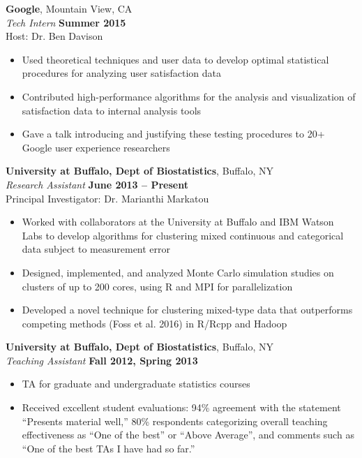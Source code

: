 \documentclass{article}
\begin{document}
 {\bf Google}, Mountain View, CA\\
 {\it Tech Intern} \hfill {\bf Summer 2015} \\
 Host: Dr. Ben Davison
 \begin{itemize} \itemsep -2pt
  \item Used theoretical techniques and user data to develop optimal statistical procedures for analyzing user satisfaction data
  \item Contributed high-performance algorithms for the analysis and visualization of satisfaction data to internal analysis tools
  \item Gave a talk introducing and justifying these testing procedures to 20+ Google user experience researchers
 \end{itemize}

 {\bf University at Buffalo, Dept of Biostatistics}, Buffalo, NY\\
 {\it Research Assistant} \hfill {\bf June 2013 -- Present} \\
 Principal Investigator: Dr. Marianthi Markatou 
 \begin{itemize} \itemsep -2pt
  \item Worked with collaborators at the University at Buffalo and IBM Watson Labs to develop algorithms for clustering mixed continuous and categorical data subject to measurement error
  \item Designed, implemented, and analyzed Monte Carlo simulation studies on clusters of up to 200 cores, using R and MPI for parallelization
  \item Developed a novel technique for clustering mixed-type data that outperforms competing methods (Foss et al. 2016) in R/Rcpp and Hadoop
 \end{itemize}

 {\bf University at Buffalo, Dept of Biostatistics}, Buffalo, NY\\
 {\it Teaching Assistant} \hfill {\bf Fall 2012, Spring 2013}
 \begin{itemize} \itemsep -2pt
  \item TA for graduate and undergraduate statistics courses
  \item Received excellent student evaluations: 94\% agreement with the statement ``Presents material well,'' 80\% respondents categorizing overall teaching effectiveness as ``One of the best'' or ``Above Average'', and comments such as ``One of the best TAs I have had so far.''
 \end{itemize}
 
\end{document}
